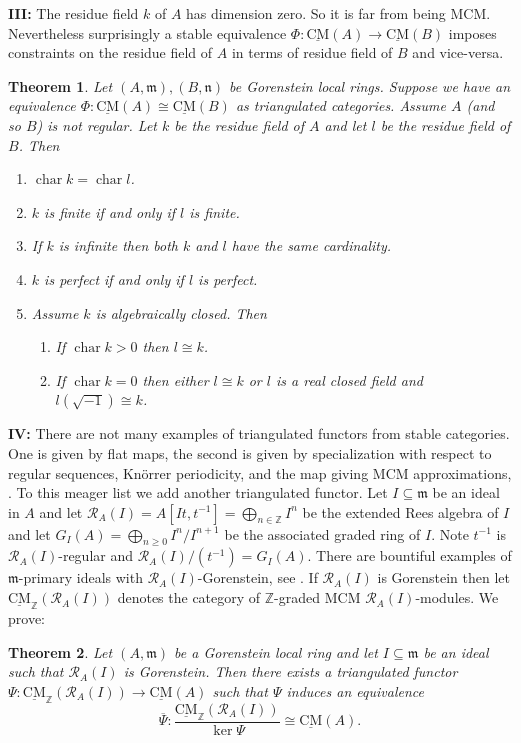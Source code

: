 \documentclass{amsart}
\newcommand{\n}{\mathfrak{n} }
\newcommand{\m}{\mathfrak{m} }
\newcommand{\Z}{\mathbb{Z} }
\newcommand{\eR}{\mathcal{R} }
\newcommand{\rt}{\rightarrow}
\newcommand{\ov}{\overline}
\newcommand{\charp}{\operatorname{char}}
\newcommand{\CMS}{\operatorname{\underline{CM}}}
\theoremstyle{plain}
\newtheorem{theorem}{Theorem}[section]
\theoremstyle{definition}
\theoremstyle{remark}
\begin{document}
{\textbf{III:} The residue field $k$ of $A$ has dimension zero. So it is far from being MCM. Nevertheless surprisingly a stable equivalence $\Phi \colon \CMS(A) \rt \CMS(B)$ imposes constraints on the residue field of $A$ in terms of residue field of $B$ and vice-versa.
\begin{theorem}
\label{third}Let $(A,\m), (B,\n) $ be  Gorenstein local rings. Suppose we have an equivalence $\Phi \colon \CMS(A) \cong \CMS(B)$ as triangulated categories. Assume $A$ (and so $B$) is not regular. Let $k$ be the residue field of $A$ and let $l$ be the residue field of $B$. Then
\begin{enumerate}[\rm (1)]
  \item $\charp k = \charp l$.
  \item $k$ is finite if and only if $l$ is finite.
  \item If $k$ is infinite then both $k$ and $l$ have the same cardinality.
  \item $k$ is perfect if and only if $l$ is perfect.
  \item Assume $k$ is algebraically closed.
  Then
  \begin{enumerate}[\rm (a)]
    \item If $\charp k > 0$ then $l \cong k$.
    \item If $\charp k = 0$ then either $l \cong k$ or $l$ is a real closed field and $l(\sqrt{-1}) \cong k$.
  \end{enumerate}
  \end{enumerate}
\end{theorem}



\textbf{IV:} There are not many examples of triangulated functors from stable categories. One is given by flat maps, the second is given by specialization with respect to regular sequences,  Kn\"orrer periodicity, \cite{K} and the map giving MCM approximations, \cite[p.\ 740]{BJM}. To this meager list we add another triangulated functor. Let $I \subseteq \m$ be an ideal in $A$ and let  $\eR_A(I) = A[It, t^{-1}] = \bigoplus_{n \in \Z}I^n$ be the extended Rees algebra of $I$ and let $G_I(A) = \bigoplus_{n\geq 0}I^n/I^{n+1}$ be the associated graded ring of $I$.  Note $t^{-1}$ is $\eR_A(I)$-regular and $\eR_A(I)/(t^{-1})  = G_I(A)$. There are bountiful examples of $\m$-primary ideals with $\eR_A(I)$-Gorenstein, see \cite[1.5]{P-Itoh-n}.
If $\eR_A(I)$ is Gorenstein then let $\CMS_\Z(\eR_A(I))$ denotes the category of $\Z$-graded MCM $\eR_A(I)$-modules.
We prove:
\begin{theorem}
\label{fourth} Let $(A,\m)$ be a Gorenstein local ring and let $I \subseteq \m$ be an ideal such that $\eR_A(I)$ is Gorenstein. Then  there exists a triangulated functor \\ $\Psi \colon \CMS_\Z(\eR_A(I)) \rt \CMS(A)$ such that $\Psi$ induces an equivalence
$$\ov{\Psi} \colon \frac{\CMS_\Z(\eR_A(I))}{\ker \Psi} \cong \CMS(A).$$
\end{theorem}

}
\end{document}
